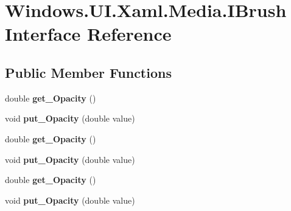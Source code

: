 \hypertarget{interface_windows_1_1_u_i_1_1_xaml_1_1_media_1_1_i_brush}{}\section{Windows.\+U\+I.\+Xaml.\+Media.\+I\+Brush Interface Reference}
\label{interface_windows_1_1_u_i_1_1_xaml_1_1_media_1_1_i_brush}
\subsection*{Public Member Functions}
\begin{DoxyCompactItemize}
\item 
\mbox{\label{interface_windows_1_1_u_i_1_1_xaml_1_1_media_1_1_i_brush_a1ea962c70b9c83e0b80abb640196a615}} 
double {\bfseries get\+\_\+\+Opacity} ()
\item 
\mbox{\label{interface_windows_1_1_u_i_1_1_xaml_1_1_media_1_1_i_brush_a715be355dc2656455f941a20044b1326}} 
void {\bfseries put\+\_\+\+Opacity} (double value)
\item 
\mbox{\label{interface_windows_1_1_u_i_1_1_xaml_1_1_media_1_1_i_brush_a1ea962c70b9c83e0b80abb640196a615}} 
double {\bfseries get\+\_\+\+Opacity} ()
\item 
\mbox{\label{interface_windows_1_1_u_i_1_1_xaml_1_1_media_1_1_i_brush_a715be355dc2656455f941a20044b1326}} 
void {\bfseries put\+\_\+\+Opacity} (double value)
\item 
\mbox{\label{interface_windows_1_1_u_i_1_1_xaml_1_1_media_1_1_i_brush_a1ea962c70b9c83e0b80abb640196a615}} 
double {\bfseries get\+\_\+\+Opacity} ()
\item 
\mbox{\label{interface_windows_1_1_u_i_1_1_xaml_1_1_media_1_1_i_brush_a715be355dc2656455f941a20044b1326}} 
void {\bfseries put\+\_\+\+Opacity} (double value)
\item 
\mbox{\label{interface_windows_1_1_u_i_1_1_xaml_1_1_media_1_1_i_brush_a1ea962c70b9c83e0b80abb640196a615}} 

\end{DoxyCompactItemize}
